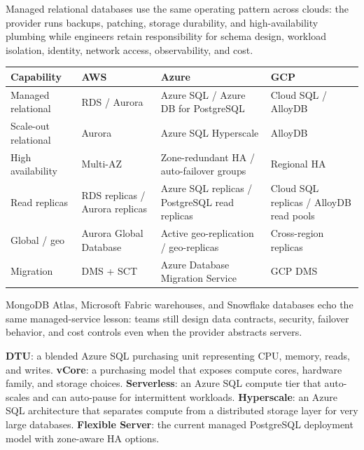 \begin{crosscloud}
Managed relational databases use the same operating pattern across clouds: the provider runs backups, patching, storage durability, and high-availability plumbing while engineers retain responsibility for schema design, workload isolation, identity, network access, observability, and cost.

\vspace{2mm}
{\footnotesize
\begin{tabular}{@{}p{3.1cm}p{3.2cm}p{3.4cm}p{3.2cm}@{}}
\toprule
\textbf{Capability} & \textbf{AWS} & \textbf{Azure} & \textbf{GCP} \\
\midrule
Managed relational & RDS / Aurora & Azure SQL / Azure DB for PostgreSQL & Cloud SQL / AlloyDB \\
Scale-out relational & Aurora & Azure SQL Hyperscale & AlloyDB \\
High availability & Multi-AZ & Zone-redundant HA / auto-failover groups & Regional HA \\
Read replicas & RDS replicas / Aurora replicas & Azure SQL replicas / PostgreSQL read replicas & Cloud SQL replicas / AlloyDB read pools \\
Global / geo & Aurora Global Database & Active geo-replication / geo-replicas & Cross-region replicas \\
Migration & DMS + SCT & Azure Database Migration Service & GCP DMS \\
\bottomrule
\end{tabular}}

\vspace{1mm}
MongoDB Atlas, Microsoft Fabric warehouses, and Snowflake databases echo the same managed-service lesson: teams still design data contracts, security, failover behavior, and cost controls even when the provider abstracts servers.
\end{crosscloud}

\begin{keyterms}
\textbf{DTU}: a blended Azure SQL purchasing unit representing CPU, memory, reads, and writes.\quad
\textbf{vCore}: a purchasing model that exposes compute cores, hardware family, and storage choices.\quad
\textbf{Serverless}: an Azure SQL compute tier that auto-scales and can auto-pause for intermittent workloads.\quad
\textbf{Hyperscale}: an Azure SQL architecture that separates compute from a distributed storage layer for very large databases.\quad
\textbf{Flexible Server}: the current managed PostgreSQL deployment model with zone-aware HA options.
\end{keyterms}

